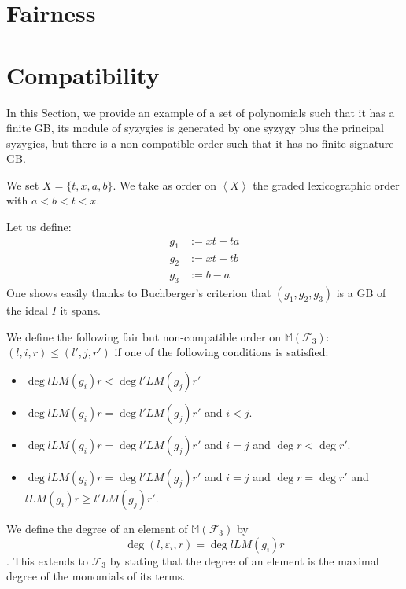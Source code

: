 \documentclass[sigconf]{acmart}
\theoremstyle{plain}
\theoremstyle{definition}
\theoremstyle{remark}
\newcommand{\MM}{\mathbb M}
\newcommand{\LM}{LM}
\begin{document}
\section{Fairness}

\section{Compatibility}

In this Section,
we provide an example
of a set of polynomials
such that 
it has a finite GB,
its module of
syzygies is generated
by one syzygy plus
the principal syzygies,
but there is
a non-compatible order
such that it
has no finite signature GB.

We set $X = \{t, x, a, b \}$.
We take as order on 
$\left\langle X \right\rangle$ the 
graded lexicographic order
with $a < b < t < x$.

Let us define:
\begin{align*}
	g_1 &:= xt - ta \\
	g_2 &:= xt - tb \\
	g_3 &:= b - a
\end{align*}
One shows easily
thanks to Buchberger's criterion
that $(g_1,g_2,g_3)$
is a GB of the ideal $I$ it spans.

We define the following
fair but non-compatible order
on $\MM \left( \mathscr{F}_3 \right):$
  $(l, i, r) \leq (l', j, r')$ if one of the following
  conditions is satisfied:
\begin{itemize}
	\item $\deg{l\LM(g_i)r} < \deg{l'\LM(g_j)r'}$
	\item $\deg{l\LM(g_i)r} = \deg{l'\LM(g_j)r'}$ and $i < j$.
	\item $\deg{l\LM(g_i)r} = \deg{l'\LM(g_j)r'}$ and $i = j$ and $\deg{r} < \deg{r'}$.
	\item $\deg{l\LM(g_i)r} = \deg{l'\LM(g_j)r'}$ and $i = j$ and $\deg{r} = \deg{r'}$ and $l\LM(g_i)r \geq l'\LM(g_j)r'$.
\end{itemize}

We define the 
degree of an element of 
$\MM \left( \mathscr{F}_3 \right)$
by $$\deg{(l, \varepsilon_i, r)} = \deg{l \LM(g_i) r}$$.
This extends to $\mathscr{F}_3$
by stating that the 
degree of 
an element is the maximal
degree of the monomials
of its terms.
\end{document}
